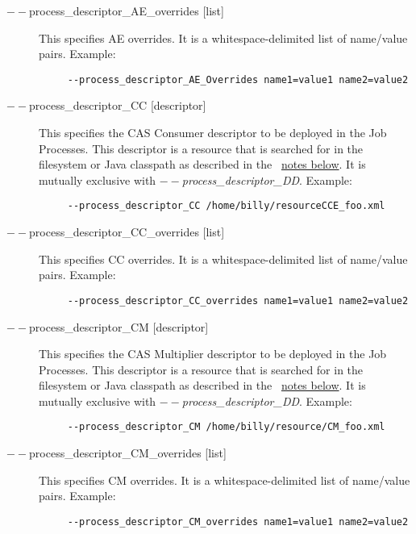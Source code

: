 \begin{description}
           \item[$--$process\_descriptor\_AE\_overrides {[list]}  ]
             This specifies AE overrides. It is a whitespace-delimited list of name/value pairs. Example: 
             \begin{verbatim}
     --process_descriptor_AE_Overrides name1=value1 name2=value2
             \end{verbatim}

           \item[$--$process\_descriptor\_CC {[descriptor]}  ]
             This specifies the CAS Consumer descriptor to be deployed in the Job Processes. This 
             descriptor is a resource that is searched for in the filesystem or Java classpath as described 
             in the ~\hyperref[par:cli.submit.notes]{notes below}.
             It is mutually exclusive with {\em $--$process\_descriptor\_DD}.
             Example: 
             \begin{verbatim}
     --process_descriptor_CC /home/billy/resourceCCE_foo.xml
             \end{verbatim}

           \item[$--$process\_descriptor\_CC\_overrides {[list]}  ]
             This specifies CC overrides. It is a whitespace-delimited list of name/value pairs. Example: 
             \begin{verbatim}
     --process_descriptor_CC_overrides name1=value1 name2=value2
             \end{verbatim}
           
           \item[$--$process\_descriptor\_CM {[descriptor]} ]
             This specifies the CAS Multiplier descriptor to be deployed in the Job Processes. This 
             descriptor is a resource that is searched for in the filesystem or Java classpath as described 
             in the ~\hyperref[par:cli.submit.notes]{notes below}.
             It is mutually exclusive with {\em $--$process\_descriptor\_DD}.
             Example: 
             \begin{verbatim}             
     --process_descriptor_CM /home/billy/resource/CM_foo.xml
             \end{verbatim}

           \item[$--$process\_descriptor\_CM\_overrides {[list]}  ]
             This specifies CM overrides. It is a whitespace-delimited list of name/value pairs. Example: 
             \begin{verbatim}
     --process_descriptor_CM_overrides name1=value1 name2=value2
             \end{verbatim}
           

\end{description}
